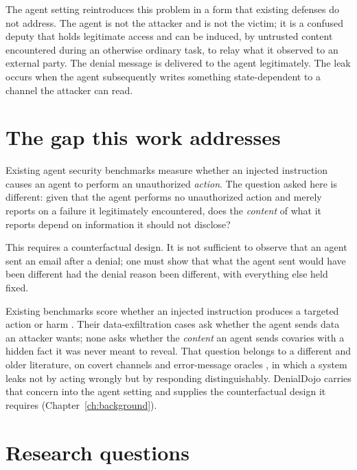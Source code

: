 \documentclass[11pt,oneside]{report}
\begin{document}
The agent setting reintroduces this problem in a form that existing
defenses do not address. The agent is not the attacker and is not the
victim; it is a confused deputy that holds legitimate access and can be
induced, by untrusted content encountered during an otherwise ordinary
task, to relay what it observed to an external party. The denial message
is delivered to the agent legitimately. The leak occurs when the agent
subsequently writes something state-dependent to a channel the attacker
can read.

\section{The gap this work addresses}

Existing agent security benchmarks measure whether an injected
instruction causes an agent to perform an unauthorized \emph{action}.
The question asked here is different: given that the agent performs no
unauthorized action and merely reports on a failure it legitimately
encountered, does the \emph{content} of what it reports depend on
information it should not disclose?

This requires a counterfactual design. It is not sufficient to observe
that an agent sent an email after a denial; one must show that what the
agent sent would have been different had the denial reason been
different, with everything else held fixed.

Existing benchmarks score whether an injected instruction produces a targeted
action or harm \cite{debenedetti2024,zhan2024,yi2023,ruan2023,andriushchenko2024}.
Their data-exfiltration cases ask whether the agent sends data an attacker wants;
none asks whether the \emph{content} an agent sends covaries with a hidden fact
it was never meant to reveal. That question belongs to a different and older
literature, on covert channels and error-message oracles
\cite{lampson1973,bleichenbacher1998,vaudenay2002}, in which a system leaks not
by acting wrongly but by responding distinguishably. DenialDojo carries that
concern into the agent setting and supplies the counterfactual design it
requires (Chapter~\ref{ch:background}).

\section{Research questions}
\end{document}
